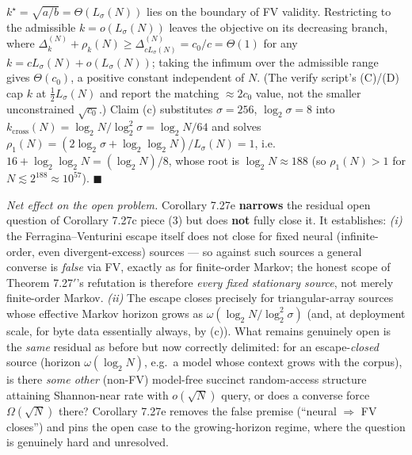 \documentclass[
]{article}
\begin{document}
$k^\star = \sqrt{a/b} = \Theta(L_\sigma(N))$ lies on the boundary of FV
validity. Restricting to the admissible $k = o(L_\sigma(N))$ leaves the
objective on its decreasing branch, where $\Delta_k^{(N)} + \rho_k(N) \geq
\Delta_{cL_\sigma(N)}^{(N)} = c_0/c = \Theta(1)$ for any $k = cL_\sigma(N)
+ o(L_\sigma(N))$; taking the infimum over the admissible range gives
$\Theta(c_0)$, a positive constant independent of $N$. (The verify
script's (C)/(D) cap $k$ at $\tfrac12 L_\sigma(N)$ and report the
matching $\approx 2c_0$ value, not the smaller unconstrained $\sqrt
{c_0}$.) Claim (c) substitutes $\sigma = 256$, $\log_2\sigma = 8$ into
$k_{\mathrm{cross}}(N) = \log_2 N/\log_2^2\sigma = \log_2 N/64$ and
solves $\rho_1(N) = (2\log_2\sigma + \log_2\log_2 N)/L_\sigma(N) = 1$,
i.e.\ $16 + \log_2\log_2 N = (\log_2 N)/8$, whose root is $\log_2 N
\approx 188$ (so $\rho_1(N) > 1$ for $N \lesssim 2^{188} \approx
10^{57}$). \hfill$\blacksquare$

\emph{Net effect on the open problem.} Corollary 7.27e \textbf{narrows}
the residual open question of Corollary 7.27c piece (3) but does
\textbf{not} fully close it. It establishes: \emph{(i)} the
Ferragina--Venturini escape itself does not close for fixed neural
(infinite-order, even divergent-excess) sources --- so against such
sources a general converse is \emph{false} via FV, exactly as for
finite-order Markov; the honest scope of Theorem 7.27$'$'s refutation is
therefore \emph{every fixed stationary source}, not merely finite-order
Markov. \emph{(ii)} The escape closes precisely for triangular-array
sources whose effective Markov horizon grows as $\omega(\log_2 N /
\log_2^2\sigma)$ (and, at deployment scale, for byte data essentially
always, by (c)). What remains genuinely open is the \emph{same} residual
as before but now correctly delimited: for an escape-\emph{closed} source
(horizon $\omega(\log_2 N)$, e.g.\ a model whose context grows with the
corpus), is there \emph{some other} (non-FV) model-free succinct
random-access structure attaining Shannon-near rate with $o(\sqrt{N})$
query, or does a converse force $\Omega(\sqrt{N})$ there? Corollary 7.27e
removes the false premise (``neural $\Rightarrow$ FV closes'') and pins
the open case to the growing-horizon regime, where the question is
genuinely hard and unresolved.
\end{document}
